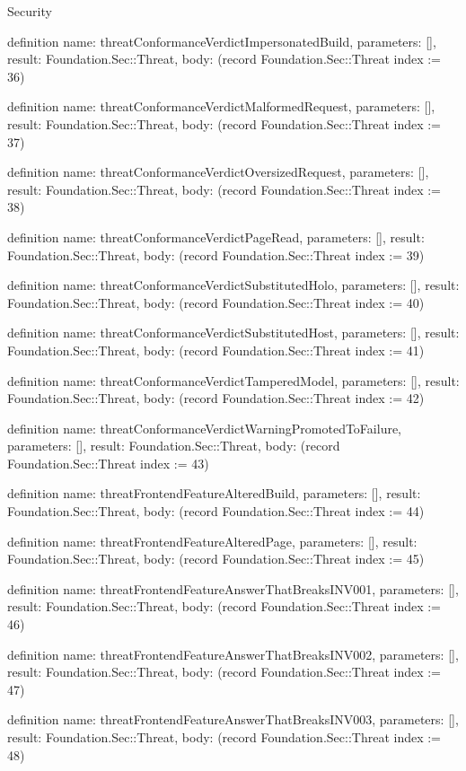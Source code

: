 \begin{lexlean}{Security}
\begin{semanticmodule}
definition{
  name: threatConformanceVerdictImpersonatedBuild,
  parameters: [],
  result: Foundation.Sec::Threat,
  body: (record Foundation.Sec::Threat {index := 36})
}

definition{
  name: threatConformanceVerdictMalformedRequest,
  parameters: [],
  result: Foundation.Sec::Threat,
  body: (record Foundation.Sec::Threat {index := 37})
}

definition{
  name: threatConformanceVerdictOversizedRequest,
  parameters: [],
  result: Foundation.Sec::Threat,
  body: (record Foundation.Sec::Threat {index := 38})
}

definition{
  name: threatConformanceVerdictPageRead,
  parameters: [],
  result: Foundation.Sec::Threat,
  body: (record Foundation.Sec::Threat {index := 39})
}

definition{
  name: threatConformanceVerdictSubstitutedHolo,
  parameters: [],
  result: Foundation.Sec::Threat,
  body: (record Foundation.Sec::Threat {index := 40})
}

definition{
  name: threatConformanceVerdictSubstitutedHost,
  parameters: [],
  result: Foundation.Sec::Threat,
  body: (record Foundation.Sec::Threat {index := 41})
}

definition{
  name: threatConformanceVerdictTamperedModel,
  parameters: [],
  result: Foundation.Sec::Threat,
  body: (record Foundation.Sec::Threat {index := 42})
}

definition{
  name: threatConformanceVerdictWarningPromotedToFailure,
  parameters: [],
  result: Foundation.Sec::Threat,
  body: (record Foundation.Sec::Threat {index := 43})
}

definition{
  name: threatFrontendFeatureAlteredBuild,
  parameters: [],
  result: Foundation.Sec::Threat,
  body: (record Foundation.Sec::Threat {index := 44})
}

definition{
  name: threatFrontendFeatureAlteredPage,
  parameters: [],
  result: Foundation.Sec::Threat,
  body: (record Foundation.Sec::Threat {index := 45})
}

definition{
  name: threatFrontendFeatureAnswerThatBreaksINV001,
  parameters: [],
  result: Foundation.Sec::Threat,
  body: (record Foundation.Sec::Threat {index := 46})
}

definition{
  name: threatFrontendFeatureAnswerThatBreaksINV002,
  parameters: [],
  result: Foundation.Sec::Threat,
  body: (record Foundation.Sec::Threat {index := 47})
}

definition{
  name: threatFrontendFeatureAnswerThatBreaksINV003,
  parameters: [],
  result: Foundation.Sec::Threat,
  body: (record Foundation.Sec::Threat {index := 48})
}


\end{semanticmodule}
\end{lexlean}
